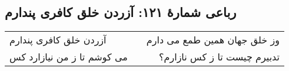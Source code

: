 \begin{center}
\section*{رباعی شمارهٔ ۱۲۱: آزردن خلق کافری پندارم}
\label{sec:121}
\begin{longtable}{l p{0.5cm} r}
آزردن خلق کافری پندارم
&&
وز خلق جهان همین طمع می دارم
\\
می کوشم تا ز من نیازارد کس
&&
تدبیرم چیست تا ز کس نازارم؟
\\
\end{longtable}
\end{center}

